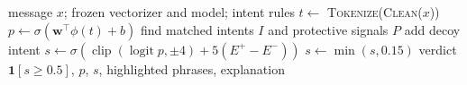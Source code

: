 \begin{algorithm}[H]
\caption{Scoring one message in the live service}
\label{alg:infer}
\begin{algorithmic}[1]
\Require message $x$; frozen vectorizer and model; intent rules
\State $t\gets$ \textsc{Tokenize}(\textsc{Clean}($x$))
\State $p\gets\sigma(\mathbf{w}^\top\phi(t)+b)$
\State find matched intents $I$ and protective signals $P$
 \State add decoy intent \EndIf
\State $s\gets\sigma(\operatorname{clip}(\operatorname{logit}p,\pm4)+5(E^+-E^-))$
 \State $s\gets\min(s,0.15)$ \EndIf
\State \Return verdict $\mathbf{1}[s\ge0.5]$, $p$, $s$, highlighted phrases, explanation
\end{algorithmic}
\end{algorithm}